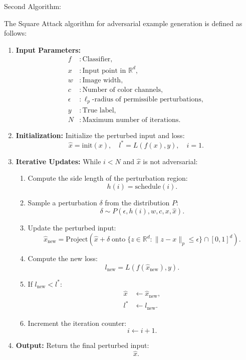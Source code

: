 Second Algorithm:

The Square Attack algorithm for adversarial example generation is defined as follows:

\begin{enumerate}
    \item \textbf{Input Parameters:}  
    \begin{align*}
    f &: \text{Classifier}, \\
    x &: \text{Input point in } \mathbb{R}^d, \\
    w &: \text{Image width}, \\
    c &: \text{Number of color channels}, \\
    \epsilon &: \ell_p\text{-radius of permissible perturbations}, \\
    y &: \text{True label}, \\
    N &: \text{Maximum number of iterations}.
    \end{align*}

    \item \textbf{Initialization:}  
    Initialize the perturbed input and loss:  
    \[
    \hat{x} = \text{init}(x), \quad l^* = L(f(x), y), \quad i = 1.
    \]

    \item \textbf{Iterative Updates:}  
    While $i < N$ and $\hat{x}$ is not adversarial:
    \begin{enumerate}
        \item Compute the side length of the perturbation region:
        \[
        h(i) = \text{schedule}(i).
        \]
        \item Sample a perturbation $\delta$ from the distribution $P$:  
        \[
        \delta \sim P(\epsilon, h(i), w, c, x, \hat{x}).
        \]
        \item Update the perturbed input:  
        \[
        \hat{x}_{\text{new}} = \text{Project}\left( \hat{x} + \delta \; \text{onto} \; \{z \in \mathbb{R}^d : \|z - x\|_p \leq \epsilon\} \cap [0, 1]^d \right).
        \]
        \item Compute the new loss:
        \[
        l_{\text{new}} = L(f(\hat{x}_{\text{new}}), y).
        \]
        \item If $l_{\text{new}} < l^*$:
        \begin{align*}
        \hat{x} &\gets \hat{x}_{\text{new}}, \\
        l^* &\gets l_{\text{new}}.
        \end{align*}
        \item Increment the iteration counter:
        \[
        i \gets i + 1.
        \]
    \end{enumerate}

    \item \textbf{Output:}  
    Return the final perturbed input:  
    \[
    \hat{x}.
    \]
\end{enumerate}

